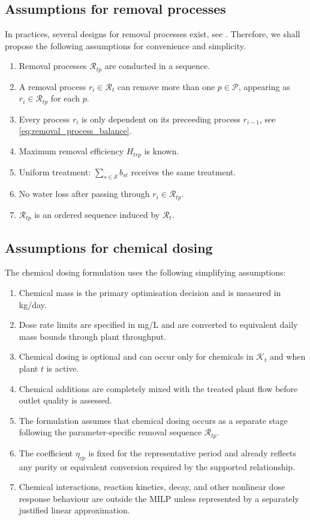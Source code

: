 \documentclass[10pt]{article}
\begin{document}
\subsection{Assumptions for removal processes}
\label{sec:removal_process_axiom}
In practices, several designs for removal processes exist, see \cite{lower_murray_water2023, zouboulis2005improvement}. Therefore, we shall propose the following assumptions for convenience and simplicity.
\begin{enumerate}[label=(\roman*), align=left, widest=viii]
    \item Removal processes $\mathcal R_{tp}$ are conducted in a sequence.
    \item A removal process $r_i \in \mathcal R_{t}$ can remove more than one $p \in \mathcal P$, appearing as $r_i \in \mathcal R_{tp}$ for each $p$.
    \item Every process $r_i$ is only dependent on its preceeding process $r_{i - 1}$, see \eqref{eq:removal_process_balance}.
    \item Maximum removal efficiency $H_{trp}$ is known.
    \item Uniform treatment: $\sum_{s \in \mathcal S} b_{st}$ receives the same treatment.
    \item No water loss after passing through $r_i \in \mathcal R_{tp}$.
    \item $\mathcal{R}_{tp}$ is an ordered sequence induced by $\mathcal{R}_{t}$.
\end{enumerate}



\subsection{Assumptions for chemical dosing}

The chemical dosing formulation uses the following simplifying assumptions:
\begin{enumerate}[label=(\roman*), align=left, widest=vii]
    \item Chemical mass is the primary optimisation decision and is measured in kg/day.
    \item Dose rate limits are specified in mg/L and are converted to equivalent daily mass bounds through plant throughput.
    \item Chemical dosing is optional and can occur only for chemicals in $\mathcal{K}_t$ and when plant $t$ is active.
    \item Chemical additions are completely mixed with the treated plant flow before outlet quality is assessed.
    \item The formulation assumes that chemical dosing occurs as a separate stage following the parameter-specific removal sequence $\mathcal{R}_{tp}$.
    \item The coefficient $\eta_{cp}$ is fixed for the representative period and already reflects any purity or equivalent conversion required by the supported relationship.
    \item Chemical interactions, reaction kinetics, decay, and other nonlinear dose response behaviour are outside the MILP unless represented by a separately justified linear approximation.
\end{enumerate}
\end{document}
